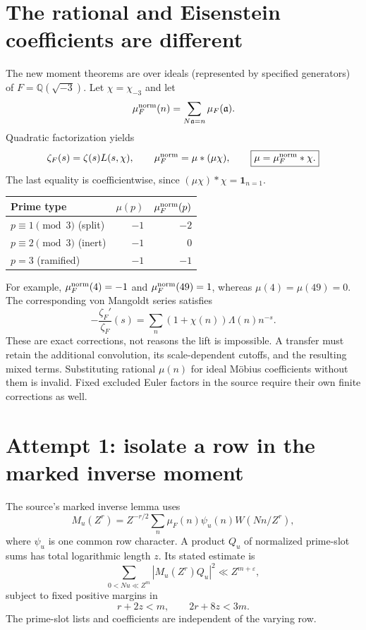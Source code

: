 \documentclass[11pt]{article}
\newcommand{\Q}{\mathbb Q}
\begin{document}
\section{The rational and Eisenstein coefficients are different}
The new moment theorems are over ideals (represented by specified
generators) of $F=\Q(\sqrt{-3})$. Let $\chi=\chi_{-3}$ and let
\[
 \mu_F^{\rm norm}(n)=\sum_{N\mathfrak a=n}\mu_F(\mathfrak a).
\]
Quadratic factorization yields
\[
 \zeta_F(s)=\zeta(s)L(s,\chi),\qquad
 \mu_F^{\rm norm}=\mu*(\mu\chi),\qquad
 \boxed{\mu=\mu_F^{\rm norm}*\chi.}
\]
The last equality is coefficientwise, since
$(\mu\chi)*\chi=\mathbf1_{n=1}$.
\begin{center}
\begin{tabular}{lrr}
\toprule
Prime type & $\mu(p)$ & $\mu_F^{\rm norm}(p)$\\
\midrule
$p\equiv1\pmod3$ (split) & $-1$ & $-2$\\
$p\equiv2\pmod3$ (inert) & $-1$ & $0$\\
$p=3$ (ramified) & $-1$ & $-1$\\
\bottomrule
\end{tabular}
\end{center}
For example, $\mu_F^{\rm norm}(4)=-1$ and
$\mu_F^{\rm norm}(49)=1$, whereas $\mu(4)=\mu(49)=0$.
The corresponding von Mangoldt series satisfies
\[
 -\frac{\zeta_F'}{\zeta_F}(s)
 =\sum_n(1+\chi(n))\Lambda(n)n^{-s}.
\]
These are exact corrections, not reasons the lift is impossible. A
transfer must retain the additional convolution, its scale-dependent
cutoffs, and the resulting mixed terms. Substituting rational $\mu(n)$
for ideal M\"obius coefficients without them is invalid. Fixed excluded
Euler factors in the source require their own finite corrections as well.

\section{Attempt 1: isolate a row in the marked inverse moment}
The source's marked inverse lemma uses
\[
 M_u(Z^r)=Z^{-r/2}\sum_n\mu_F(n)\psi_u(n)W(Nn/Z^r),
\]
where $\psi_u$ is one common row character. A product $Q_u$ of normalized
prime-slot sums has total logarithmic length $z$. Its stated estimate is
\begin{equation}\label{eq:moment}
 \sum_{0<Nu\ll Z^m}|M_u(Z^r)Q_u|^2\ll Z^{m+\varepsilon},
\end{equation}
subject to fixed positive margins in
\begin{equation}\label{eq:constraints}
 r+2z<m,\qquad 2r+8z<3m.
\end{equation}
The prime-slot lists and coefficients are independent of the varying row.
\end{document}
